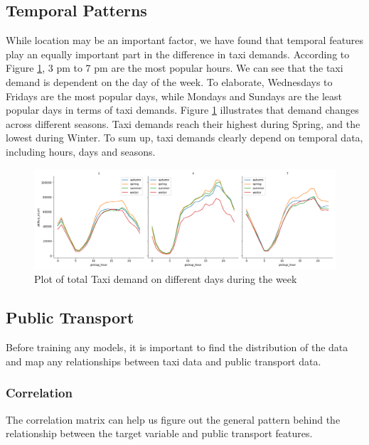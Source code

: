 \documentclass[11pt]{article}
\begin{document}
\subsection{Temporal Patterns}

While location may be an important factor, we have found that temporal features play an equally important part in the difference in taxi demands. According to Figure \ref{fig:lineplot_demand}, 3 pm to 7 pm are the most popular hours. We can see that the taxi demand is dependent on the day of the week. To elaborate, Wednesdays to Fridays are the most popular days, while Mondays and Sundays are the least popular days in terms of taxi demands. Figure \ref{fig:lineplot_demand} illustrates that demand changes across different seasons. Taxi demands reach their highest during Spring, and the lowest during Winter. To sum up, taxi demands clearly depend on temporal data, including hours, days and seasons.

\begin{figure}
    \centering
    \includegraphics[width=\textwidth]{line_plot_pickup_count.png}
    \caption{Plot of total Taxi demand on different days during the week}
    \label{fig:lineplot_demand}
\end{figure}

\subsection{Public Transport}

Before training any models, it is important to find the distribution of the data and map any relationships between taxi data and public transport data.

\subsubsection{Correlation}

The correlation matrix can help us figure out the general pattern behind the relationship between the target variable and public transport features. 
\end{document}
